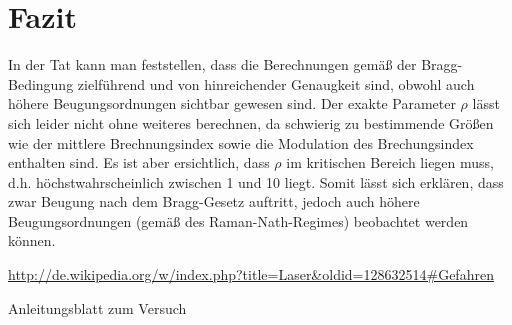 \documentclass[bigchapter,colorback,accentcolor=tud4b,linedtoc,11pt]{tudreport}
\begin{document}
\chapter{Fazit}

In der Tat kann man feststellen, dass die Berechnungen gemäß der Bragg-Bedingung zielführend und von hinreichender Genaugkeit sind, obwohl auch höhere Beugungsordnungen sichtbar gewesen sind. Der exakte Parameter $\rho$ lässt sich leider nicht ohne weiteres berechnen, da schwierig zu bestimmende Größen wie der mittlere Brechnungsindex sowie die Modulation des Brechungsindex enthalten sind. Es ist aber ersichtlich, dass $\rho$ im kritischen Bereich liegen muss, d.h. höchstwahrscheinlich zwischen 1 und 10 liegt. Somit lässt sich erklären, dass zwar Beugung nach dem Bragg-Gesetz auftritt, jedoch auch höhere Beugungsordnungen (gemäß des Raman-Nath-Regimes) beobachtet werden können.

\cleardoublepage{}
\newpage
\begin{thebibliography}{100}
    \url{http://de.wikipedia.org/w/index.php?title=Laser&oldid=128632514#Gefahren}
   
    Anleitungsblatt zum Versuch
\end{thebibliography}

\cleardoublepage{}
\end{document}

